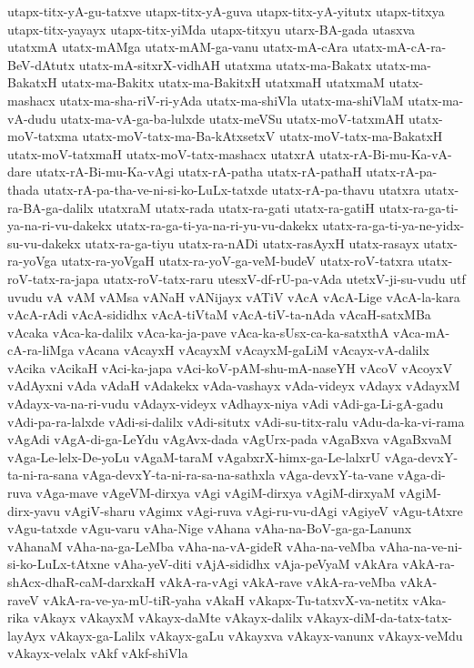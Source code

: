 {utapx-titx-yA-gu-tatxve
utapx-titx-yA-guva
utapx-titx-yA-yitutx
utapx-titxya
utapx-titx-yayayx
utapx-titx-yiMda
utapx-titxyu
utarx-BA-gada
utasxva
utatxmA
utatx-mAMga
utatx-mAM-ga-vanu
utatx-mA-cAra
utatx-mA-cA-ra-BeV-dAtutx
utatx-mA-sitxrX-vidhAH
utatxma
utatx-ma-Bakatx
utatx-ma-BakatxH
utatx-ma-Bakitx
utatx-ma-BakitxH
utatxmaH
utatxmaM
utatx-mashacx
utatx-ma-sha-riV-ri-yAda
utatx-ma-shiVla
utatx-ma-shiVlaM
utatx-ma-vA-dudu
utatx-ma-vA-ga-ba-lulxde
utatx-meVSu
utatx-moV-tatxmAH
utatx-moV-tatxma
utatx-moV-tatx-ma-Ba-kAtxsetxV
utatx-moV-tatx-ma-BakatxH
utatx-moV-tatxmaH
utatx-moV-tatx-mashacx
utatxrA
utatx-rA-Bi-mu-Ka-vA-dare
utatx-rA-Bi-mu-Ka-vAgi
utatx-rA-patha
utatx-rA-pathaH
utatx-rA-pa-thada
utatx-rA-pa-tha-ve-ni-si-ko-LuLx-tatxde
utatx-rA-pa-thavu
utatxra
utatx-ra-BA-ga-dalilx
utatxraM
utatx-rada
utatx-ra-gati
utatx-ra-gatiH
utatx-ra-ga-ti-ya-na-ri-vu-dakekx
utatx-ra-ga-ti-ya-na-ri-yu-vu-dakekx
utatx-ra-ga-ti-ya-ne-yidx-su-vu-dakekx
utatx-ra-ga-tiyu
utatx-ra-nADi
utatx-rasAyxH
utatx-rasayx
utatx-ra-yoVga
utatx-ra-yoVgaH
utatx-ra-yoV-ga-veM-budeV
utatx-roV-tatxra
utatx-roV-tatx-ra-japa
utatx-roV-tatx-raru
utesxV-df-rU-pa-vAda
utetxV-ji-su-vudu
utf
uvudu
vA
vAM
vAMsa
vANaH
vANijayx
vATiV
vAcA
vAcA-Lige
vAcA-la-kara
vAcA-rAdi
vAcA-sididhx
vAcA-tiVtaM
vAcA-tiV-ta-nAda
vAcaH-satxMBa
vAcaka
vAca-ka-dalilx
vAca-ka-ja-pave
vAca-ka-sUsx-ca-ka-satxthA
vAca-mA-cA-ra-liMga
vAcana
vAcayxH
vAcayxM
vAcayxM-gaLiM
vAcayx-vA-dalilx
vAcika
vAcikaH
vAci-ka-japa
vAci-koV-pAM-shu-mA-naseYH
vAcoV
vAcoyxV
vAdAyxni
vAda
vAdaH
vAdakekx
vAda-vashayx
vAda-videyx
vAdayx
vAdayxM
vAdayx-va-na-ri-vudu
vAdayx-videyx
vAdhayx-niya
vAdi
vAdi-ga-Li-gA-gadu
vAdi-pa-ra-lalxde
vAdi-si-dalilx
vAdi-situtx
vAdi-su-titx-ralu
vAdu-da-ka-vi-rama
vAgAdi
vAgA-di-ga-LeYdu
vAgAvx-dada
vAgUrx-pada
vAgaBxva
vAgaBxvaM
vAga-Le-lelx-De-yoLu
vAgaM-taraM
vAgabxrX-himx-ga-Le-lalxrU
vAga-devxY-ta-ni-ra-sana
vAga-devxY-ta-ni-ra-sa-na-sathxla
vAga-devxY-ta-vane
vAga-di-ruva
vAga-mave
vAgeVM-dirxya
vAgi
vAgiM-dirxya
vAgiM-dirxyaM
vAgiM-dirx-yavu
vAgiV-sharu
vAgimx
vAgi-ruva
vAgi-ru-vu-dAgi
vAgiyeV
vAgu-tAtxre
vAgu-tatxde
vAgu-varu
vAha-Nige
vAhana
vAha-na-BoV-ga-ga-Lanunx
vAhanaM
vAha-na-ga-LeMba
vAha-na-vA-gideR
vAha-na-veMba
vAha-na-ve-ni-si-ko-LuLx-tAtxne
vAha-yeV-diti
vAjA-sididhx
vAja-peVyaM
vAkAra
vAkA-ra-shAcx-dhaR-caM-darxkaH
vAkA-ra-vAgi
vAkA-rave
vAkA-ra-veMba
vAkA-raveV
vAkA-ra-ve-ya-mU-tiR-yaha
vAkaH
vAkapx-Tu-tatxvX-va-netitx
vAka-rika
vAkayx
vAkayxM
vAkayx-daMte
vAkayx-dalilx
vAkayx-diM-da-tatx-tatx-layAyx
vAkayx-ga-Lalilx
vAkayx-gaLu
vAkayxva
vAkayx-vanunx
vAkayx-veMdu
vAkayx-velalx
vAkf
vAkf-shiVla
}
